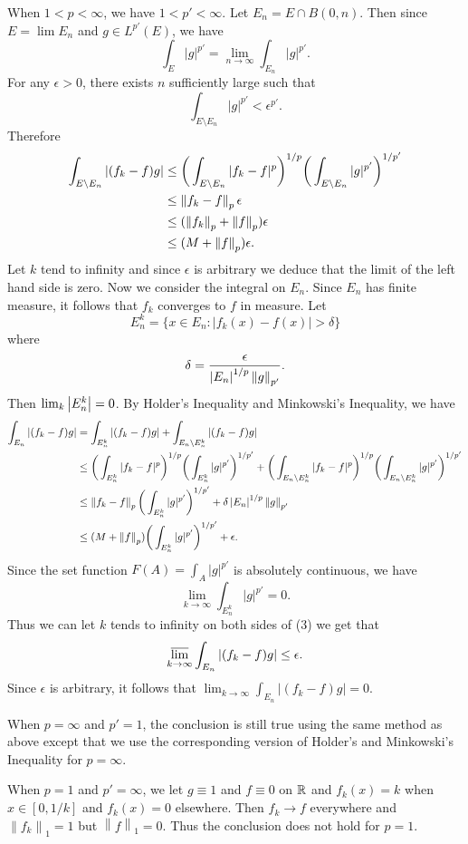 \begin{exercise}{8.13}
  When $1<p<\infty$, we have $1<p'<\infty$. Let $E_n=E\cap B(0,n)$. Then since $E=\lim E_n$ and $g\in L^{p'}(E)$, we have
  \[
    \int_E|g|^{p'}=\lim_{n\rightarrow\infty}\int_{E_n}|g|^{p'}.
  \]
  For any $\epsilon>0$, there exists $n$ sufficiently large such that 
  \[
    \int_{E\setminus E_n}|g|^{p'}<\epsilon^{p'}.
  \]
  Therefore
  \begin{align*}
      \int_{E\setminus E_n}|(f_k-f)g|&\leq \bigg(\int_{E\setminus E_n}|f_k-f|^p\bigg)^{1/p}\bigg(\int_{E\setminus E_n}|g|^{p'}\bigg)^{1/{p'}}\\
      &\leq \left\|f_k-f\right\|_p\epsilon\\
      &\leq (\left\|f_k\right\|_p+\left\|f\right\|_p)\epsilon\\
      &\leq (M+\left\|f\right\|_p)\epsilon.
  \end{align*}
  Let $k$ tend to infinity and since $\epsilon$ is arbitrary we deduce that the limit of the left hand side is zero. Now we consider the integral on $E_n$. Since $E_n$ has finite measure, it follows that $f_k$ converges to $f$ in measure. Let 
  \[
    E_n^k=\{x\in E_n:|f_k(x)-f(x)|>\delta\}
  \]
  where 
  \[
    \delta=\frac{\epsilon}{\left\vert E_n\right\vert^{1/p}\left\|g\right\|_{p'}}.
  \] Then $\lim_k\left\vert E_n^k\right\vert=0$. By Holder's Inequality and Minkowski's Inequality, we have
  \begin{align}
      \int_{E_n}|(f_k-f)g|&=\int_{E_n^k}|(f_k-f)g|+\int_{E_n\setminus E_n^k}|(f_k-f)g|\notag\\
      &\leq \bigg(\int_{E_n^k}|f_k-f|^p\bigg)^{1/p}\bigg(\int_{E_n^k}|g|^{p'}\bigg)^{1/{p'}}+\bigg(\int_{E_n\setminus E_n^k}|f_k-f|^p\bigg)^{1/p}\bigg(\int_{E_n\setminus E_n^k}|g|^{p'}\bigg)^{1/{p'}}\notag\\
      &\leq \left\|f_k-f\right\|_p\bigg(\int_{E_n^k}|g|^{p'}\bigg)^{1/{p'}}+\delta\left\vert E_n\right\vert^{1/p}\left\|g\right\|_{p'}\notag\\
      &\leq (M+\left\|f\right\|_p)\bigg(\int_{E_n^k}|g|^{p'}\bigg)^{1/{p'}}+\epsilon.
  \end{align}
  Since the set function $F(A)=\int_A|g|^{p'}$ is absolutely continuous, we have
  \[
    \lim_{k\rightarrow\infty}\int_{E_n^k}|g|^{p'}=0.
  \]
  Thus we can let $k$ tends to infinity on both sides of (3) we get that 
  \[
    \varlimsup_{k\rightarrow\infty}\int_{E_n}|(f_k-f)g|\leq \epsilon.
  \]
  Since $\epsilon$ is arbitrary, it follows that $\lim_{k\rightarrow\infty}\int_{E_n}|(f_k-f)g|=0.$
  
  When $p=\infty$ and $p'=1$, the conclusion is still true using the same method as above except that we use the corresponding version of Holder's and Minkowski's Inequality for $p=\infty.$
  
  When $p=1$ and $p'=\infty$, we let $g\equiv 1$ and $f\equiv 0$ on $\mathbb{R}$ and $f_k(x)=k$ when $x\in[0,1/k]$ and $f_k(x)=0$ elsewhere. Then $f_k\rightarrow f$ everywhere and $\left\|f_k\right\|_1=1$ but $\left\|f\right\|_1=0$. Thus the conclusion does not hold for $p=1.$
\end{exercise}

